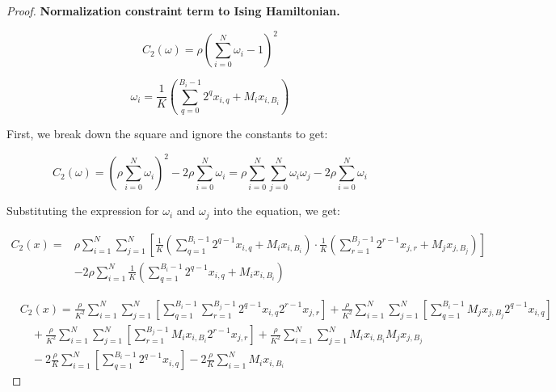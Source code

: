 \documentclass[12pt,a4paper]{report}
\begin{document}
\begin{proof}
\textbf{Normalization constraint term to Ising Hamiltonian.}

\noindent\begin{minipage}{.45\textwidth}
\[ C_2(\omega) = \rho \left( \sum_{i=0}^{N} \omega_i - 1 \right)^2 \]
\end{minipage}%
\begin{minipage}{.55\textwidth}
\[ \omega_i = \frac{1}{K} \left( \sum_{q=0}^{B_i - 1} 2^q x_{i, q} + M_i x_{i, B_i} \right) \]
\end{minipage}

\begin{center}
First, we break down the square and ignore the constants to get:
\end{center}

\[ C_2(\omega) = \left( \rho \sum_{i=0}^{N} \omega_i \right)^2 - 2 \rho \sum_{i=0}^{N} \omega_i = \rho \sum_{i=0}^{N} \sum_{j=0}^{N} \omega_i \omega_j - 2 \rho \sum_{i=0}^{N} \omega_i \]

\begin{center}
Substituting the expression for \( \omega_i \) and \( \omega_j \) into the equation, we get:
\end{center}

\begin{align*}
C_2(x) = & \rho \sum_{i=1}^{N} \sum_{j=1}^{N} \left[ \frac{1}{K} \left( \sum_{q=1}^{B_i-1} 2^{q-1} x_{i,q} + M_i x_{i,B_i} \right) \cdot \frac{1}{K} \left( \sum_{r=1}^{B_j-1} 2^{r-1} x_{j,r} + M_j x_{j,B_j} \right) \right] \\
& - 2 \rho \sum_{i=1}^{N} \frac{1}{K} \left( \sum_{q=1}^{B_i-1} 2^{q-1} x_{i,q} + M_i x_{i,B_i} \right)
\end{align*}

\begin{align*}
& C_2(x) = \frac{\rho}{K^2} \sum_{i=1}^{N} \sum_{j=1}^{N} \left[ \sum_{q=1}^{B_i-1} \sum_{r=1}^{B_j-1} 2^{q-1} x_{i,q} 2^{r-1} x_{j,r} \right] + \frac{\rho}{K^2} \sum_{i=1}^{N} \sum_{j=1}^{N} \left[ \sum_{q=1}^{B_i-1} M_j x_{j,B_j} 2^{q-1} x_{i,q} \right] \\
& \quad + \frac{\rho}{K^2} \sum_{i=1}^{N} \sum_{j=1}^{N} \left[ \sum_{r=1}^{B_j-1} M_i x_{i,B_i} 2^{r-1} x_{j,r} \right] + \frac{\rho}{K^2} \sum_{i=1}^{N} \sum_{j=1}^{N} M_i x_{i,B_i} M_j x_{j,B_j} \\
& \quad - 2\frac{\rho}{K} \sum_{i=1}^{N} \left[ \sum_{q=1}^{B_i-1} 2^{q-1} x_{i,q} \right] - 2\frac{\rho}{K} \sum_{i=1}^{N} M_i x_{i,B_i}
\end{align*}



\end{proof}
\end{document}
